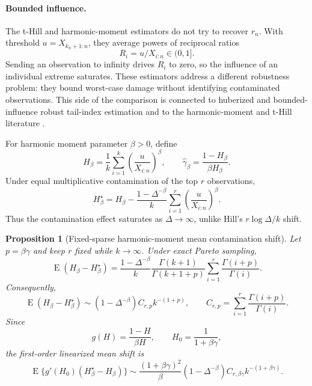 \documentclass[11pt]{article}
\newtheorem{proposition}{Proposition}
\DeclareMathOperator{\E}{E}
\begin{document}
\paragraph{Bounded influence.}
The t-Hill and harmonic-moment estimators do not try to recover $r_n$.  With
threshold $u=X_{k_n+1:n}$, they average powers of reciprocal ratios
\[
  R_i=u/X_{i:n}\in(0,1].
\]
Sending an observation to infinity drives $R_i$ to zero, so the influence of an
individual extreme saturates.  These estimators address a different robustness
problem: they bound worst-case damage without identifying contaminated
observations.  This side of the comparison is connected to huberized and
bounded-influence robust tail-index estimation
\citep{beran-schell-2012,vandewalle-beirlant-christmann-hubert-2007} and to the
harmonic-moment and t-Hill literature
\citep{beran-schell-stehlik-2014,jordanova-fabian-hermann-2016}.

For harmonic moment parameter $\beta>0$, define
\[
  H_\beta
  =
  \frac1k\sum_{i=1}^{k}
  \left(\frac{u}{X_{i:n}}\right)^\beta,
  \qquad
  \widehat\gamma_\beta=\frac{1-H_\beta}{\beta H_\beta}.
\]
Under equal multiplicative contamination of the top $r$ observations,
\[
  H_\beta^\star
  =
  H_\beta
  -
  \frac{1-\Delta^{-\beta}}{k}
  \sum_{i=1}^{r}
  \left(\frac{u}{X_{i:n}}\right)^\beta.
\]
Thus the contamination effect saturates as $\Delta\to\infty$, unlike Hill's
$r\log\Delta/k$ shift.

\begin{proposition}[Fixed-sparse harmonic-moment mean contamination shift]
\label{prop:harmonic-fixed-r}
Let $p=\beta\gamma$ and keep $r$ fixed while $k\to\infty$.  Under exact Pareto
sampling,
\[
  \E(H_\beta-H_\beta^\star)
  =
  \frac{1-\Delta^{-\beta}}{k}
  \frac{\Gamma(k+1)}{\Gamma(k+1+p)}
  \sum_{i=1}^{r}
  \frac{\Gamma(i+p)}{\Gamma(i)}.
\]
Consequently,
\[
  \E(H_\beta-H_\beta^\star)
  \sim
  (1-\Delta^{-\beta})C_{r,p}k^{-(1+p)},
  \qquad
  C_{r,p}=\sum_{i=1}^{r}\frac{\Gamma(i+p)}{\Gamma(i)}.
\]
Since
\[
  g(H)=\frac{1-H}{\beta H},
  \qquad
  H_0=\frac{1}{1+\beta\gamma},
\]
the first-order linearized mean shift is
\[
  \E\{g'(H_0)(H_\beta^\star-H_\beta)\}
  \sim
  \frac{(1+\beta\gamma)^2}{\beta}
  (1-\Delta^{-\beta})
  C_{r,\beta\gamma}k^{-(1+\beta\gamma)}.
\]
\end{proposition}
\end{document}
